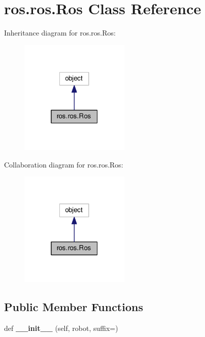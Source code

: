 \hypertarget{classros_1_1ros_1_1Ros}{}\section{ros.\+ros.\+Ros Class Reference}
\label{classros_1_1ros_1_1Ros}


Inheritance diagram for ros.\+ros.\+Ros\+:\nopagebreak
\begin{figure}[H]
\begin{center}
\leavevmode
\includegraphics[width=148pt]{classros_1_1ros_1_1Ros__inherit__graph}
\end{center}
\end{figure}


Collaboration diagram for ros.\+ros.\+Ros\+:\nopagebreak
\begin{figure}[H]
\begin{center}
\leavevmode
\includegraphics[width=148pt]{classros_1_1ros_1_1Ros__coll__graph}
\end{center}
\end{figure}
\subsection*{Public Member Functions}
\begin{DoxyCompactItemize}
\item 
def {\bfseries \+\_\+\+\_\+init\+\_\+\+\_\+} (self, robot, suffix=\textquotesingle{}\textquotesingle{})\hypertarget{classros_1_1ros_1_1Ros_afc21e7cd18df42d888198438e6a0fe6d}{}\label{classros_1_1ros_1_1Ros_afc21e7cd18df42d888198438e6a0fe6d}

\end{DoxyCompactItemize}
